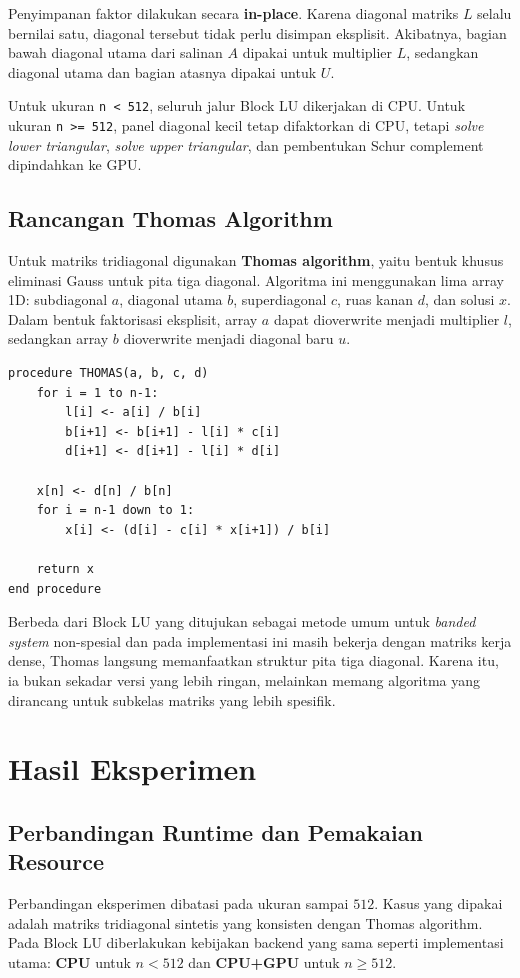 \documentclass[12pt,a4paper]{article}
\begin{document}
Penyimpanan faktor dilakukan secara \textbf{in-place}. Karena diagonal matriks $L$ selalu bernilai satu, diagonal tersebut tidak perlu disimpan eksplisit. Akibatnya, bagian bawah diagonal utama dari salinan $A$ dipakai untuk multiplier $L$, sedangkan diagonal utama dan bagian atasnya dipakai untuk $U$.

Untuk ukuran \texttt{n < 512}, seluruh jalur Block LU dikerjakan di CPU. Untuk ukuran \texttt{n >= 512}, panel diagonal kecil tetap difaktorkan di CPU, tetapi \emph{solve lower triangular}, \emph{solve upper triangular}, dan pembentukan Schur complement dipindahkan ke GPU.

\subsection{Rancangan Thomas Algorithm}
Untuk matriks tridiagonal digunakan \textbf{Thomas algorithm}, yaitu bentuk khusus eliminasi Gauss untuk pita tiga diagonal. Algoritma ini menggunakan lima array 1D: subdiagonal $a$, diagonal utama $b$, superdiagonal $c$, ruas kanan $d$, dan solusi $x$. Dalam bentuk faktorisasi eksplisit, array $a$ dapat dioverwrite menjadi multiplier $l$, sedangkan array $b$ dioverwrite menjadi diagonal baru $u$.

\begin{lstlisting}[style=pseudo,caption={Pseudocode Thomas algorithm.},label={lst:thomas}]
procedure THOMAS(a, b, c, d)
    for i = 1 to n-1:
        l[i] <- a[i] / b[i]
        b[i+1] <- b[i+1] - l[i] * c[i]
        d[i+1] <- d[i+1] - l[i] * d[i]

    x[n] <- d[n] / b[n]
    for i = n-1 down to 1:
        x[i] <- (d[i] - c[i] * x[i+1]) / b[i]

    return x
end procedure
\end{lstlisting}

Berbeda dari Block LU yang ditujukan sebagai metode umum untuk \emph{banded system} non-spesial dan pada implementasi ini masih bekerja dengan matriks kerja dense, Thomas langsung memanfaatkan struktur pita tiga diagonal. Karena itu, ia bukan sekadar versi yang lebih ringan, melainkan memang algoritma yang dirancang untuk subkelas matriks yang lebih spesifik.

\section{Hasil Eksperimen}
\subsection{Perbandingan Runtime dan Pemakaian Resource}
Perbandingan eksperimen dibatasi pada ukuran sampai $512$. Kasus yang dipakai adalah matriks tridiagonal sintetis yang konsisten dengan Thomas algorithm. Pada Block LU diberlakukan kebijakan backend yang sama seperti implementasi utama: \textbf{CPU} untuk $n<512$ dan \textbf{CPU+GPU} untuk $n\geq512$.
\end{document}
